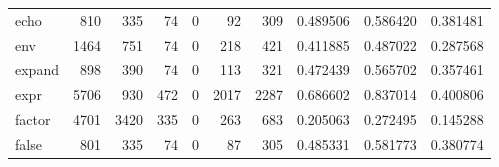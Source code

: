 \begin{longtable}{lrrrrrrrrr}
echo      &                                 810 &                                             335 &                                             74 &                                             0 &                                             92 &                                          309 &                                           0.489506 &                               0.586420 &                             0.381481 \\
env       &                                1464 &                                             751 &                                             74 &                                             0 &                                            218 &                                          421 &                                           0.411885 &                               0.487022 &                             0.287568 \\
expand    &                                 898 &                                             390 &                                             74 &                                             0 &                                            113 &                                          321 &                                           0.472439 &                               0.565702 &                             0.357461 \\
expr      &                                5706 &                                             930 &                                            472 &                                             0 &                                           2017 &                                         2287 &                                           0.686602 &                               0.837014 &                             0.400806 \\
factor    &                                4701 &                                            3420 &                                            335 &                                             0 &                                            263 &                                          683 &                                           0.205063 &                               0.272495 &                             0.145288 \\
false     &                                 801 &                                             335 &                                             74 &                                             0 &                                             87 &                                          305 &                                           0.485331 &                               0.581773 &                             0.380774 \\

\end{longtable}
